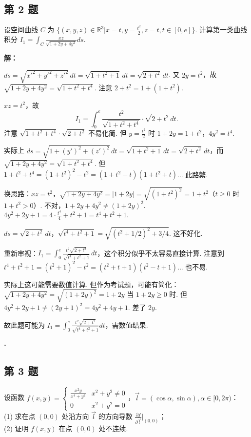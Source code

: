 \documentclass[12pt,a4paper]{article}
\newenvironment{sol}[1][解]{%
  \par\medskip\noindent\textbf{#1：}\itshape\par\noindent\ignorespaces
}{%
  \par\hfill$\square$\par\medskip
}
\begin{document}
\subsection*{第 2 题}
设空间曲线 $C$ 为 $\{(x,y,z)\in\mathbb{R}^3|x=t, y=\frac{t^2}{2}, z=t,
t\in[0,e]\}$. 计算第一类曲线积分 $I_1=\int_{C}\frac{xz}{\sqrt{1+2y+4y^2}}ds$.

\begin{sol}$ds=\sqrt{x'^2+y'^2+z'^2}\,dt=\sqrt{1+t^2+1}\,dt=\sqrt{2+t^2}\,dt$.
  又 $2y=t^2$，故 $\sqrt{1+2y+4y^2}=\sqrt{1+t^2+t^4}$. 注意 $2+t^2=1+(1+t^2)$.

  $xz=t^2$，故
  $$I_1=\int_0^e\frac{t^2}{\sqrt{1+t^2+t^4}}\cdot\sqrt{2+t^2}\,dt.$$
  注意 $\sqrt{1+t^2+t^4}\cdot\sqrt{2+t^2}$ 不易化简. 但 $y=\frac{t^2}{2}$ 时
  $1+2y=1+t^2$，$4y^2=t^4$.

  实际上
  $ds=\sqrt{1+(y')^2+(z')^2}\,dt=\sqrt{1+t^2+1}\,dt=\sqrt{2+t^2}\,dt$，而
  $\sqrt{1+2y+4y^2}=\sqrt{1+t^2+t^4}$. 但
  $1+t^2+t^4=(1+t^2)^2-t^2=(1+t^2-t)(1+t^2+t)$... 此路繁.

  换思路：$xz=t^2$，$\sqrt{1+2y+4y^2}=|1+2y|=\sqrt{(1+t^2)^2}=1+t^2$（$t\ge
  0$ 时 $1+t^2>0$）. 不对，$1+2y+4y^2\ne(1+2y)^2$.
  $4y^2+2y+1=4\cdot\frac{t^4}{4}+t^2+1=t^4+t^2+1$.

  $ds=\sqrt{2+t^2}\,dt$，$\sqrt{t^4+t^2+1}=\sqrt{(t^2+1/2)^2+3/4}$. 这不好化.

  重新审视：$I_1=\int_0^e\frac{t^2\sqrt{2+t^2}}{\sqrt{t^4+t^2+1}}\,dt$，这个积分似乎不太容易直接计算.
  注意到 $t^4+t^2+1=(t^2+1)^2-t^2=(t^2+t+1)(t^2-t+1)$... 也不易.

  实际上这可能需要数值计算. 但作为考试题，可能有简化：$\sqrt{1+2y+4y^2}=\sqrt{(1+2y)^2}=1+2y$ 当
  $1+2y\ge 0$ 时. 但 $4y^2+2y+1\ne(2y+1)^2=4y^2+4y+1$. 差了 $2y$.

  故此题可能为 $I_1=\int_0^e\frac{t^2\sqrt{2+t^2}}{\sqrt{t^4+t^2+1}}dt$，需数值结果.

\end{sol}
\subsection*{第 3 题}
设函数 $f(x,y)=
\begin{cases}\frac{x^2y}{x^4+y^2} & x^2+y^2\ne0 \\ 0 & x^2+y^2=0
\end{cases}$，$\vec{l}=(\cos\alpha,\sin\alpha), \alpha\in[0,2\pi)$：\\
(1) 求在点 $(0,0)$ 处沿方向 $\vec{l}$ 的方向导数 $\frac{\partial f}{\partial
\vec{l}}|_{(0,0)}$；\\
(2) 证明 $f(x,y)$ 在点 $(0,0)$ 处不连续.
\end{document}
